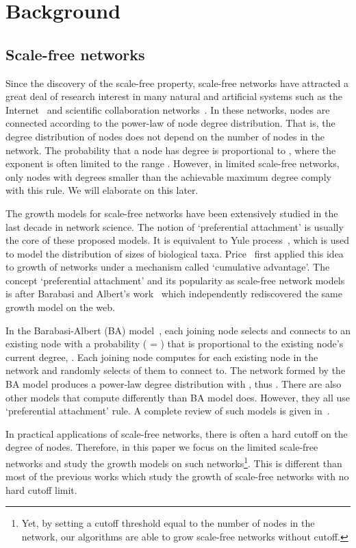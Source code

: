 \documentclass[10pt,journal,cspaper,compsoc]{IEEEtran}
\begin{document}
\section{Background}
\label{sec:back}

\subsection{Scale-free networks}

Since the discovery of the scale-free property, scale-free networks have attracted a great deal of research interest in many natural and artificial systems such as the Internet~\cite{internet} and scientific collaboration networks~\cite{collaborations}. In these networks, nodes are connected according to the power-law of node degree distribution. That is, the degree distribution of nodes does not depend on the number of nodes in the network. The probability that a node has degree  is proportional to , where the exponent is often limited to the range . However, in limited scale-free networks, only nodes with degrees smaller than the achievable maximum degree comply with this rule. We will elaborate on this later.



The growth models for scale-free networks have been extensively studied in the last decade in network science. The notion of `preferential attachment' is usually the core of these proposed models. It is equivalent to Yule process~\cite{yule}, which is used to model the distribution of sizes of biological taxa. Price~\cite{price} first applied this idea to growth of networks under a mechanism called `cumulative advantage'. The concept `preferential attachment' and its popularity as scale-free network models is after Barabasi and Albert's work~\cite{ba} which independently rediscovered the same growth model on the web.

In the Barabasi-Albert (BA) model~\cite{ba}, each joining node selects and connects to an existing node  with a probability ( = ) that is proportional to the existing node's current degree, . Each joining node computes  for each existing node in the network and randomly selects  of them to connect to. The network formed by the BA model produces a power-law degree distribution with , thus . There are also other models that compute  differently than BA model does. However, they all use `preferential attachment' rule. A complete review of such models is given in~\cite{doro}.


In practical applications of scale-free networks, there is often a hard cutoff on the degree of nodes. Therefore, in this paper we focus on the limited scale-free networks and study the growth models on such networks\footnote{Yet, by setting a cutoff threshold equal to the number of nodes in the network, our algorithms are able to grow scale-free networks without cutoff.}. This is different than most of the previous works which study the growth of scale-free networks with no hard cutoff limit.
\end{document}
